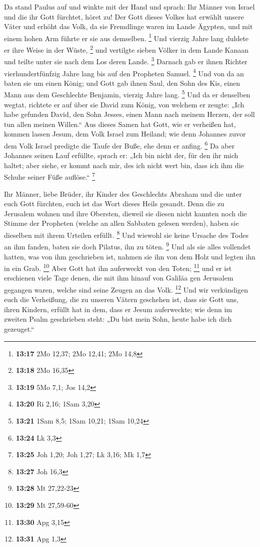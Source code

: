  Da stand Paulus auf und winkte mit der Hand und sprach:
Ihr Männer von Israel und die ihr Gott fürchtet, höret zu! 
Der Gott dieses Volkes hat erwählt unsere Väter und erhöht das Volk, da
sie Fremdlinge waren im Lande Ägypten, und mit einem hohen Arm führte er
sie aus demselben. \footnote{\textbf{13:17} 2Mo 12,37; 2Mo 12,41; 2Mo
  14,8}  Und vierzig Jahre lang duldete er ihre Weise in
der Wüste, \footnote{\textbf{13:18} 2Mo 16,35}  und
vertilgte sieben Völker in dem Lande Kanaan und teilte unter sie nach
dem Los deren Lande. \footnote{\textbf{13:19} 5Mo 7,1; Jos 14,2}
 Darnach gab er ihnen Richter vierhundertfünfzig Jahre lang
bis auf den Propheten Samuel. \footnote{\textbf{13:20} Ri 2,16; 1Sam
  3,20}  Und von da an baten sie um einen König; und Gott
gab ihnen Saul, den Sohn des Kis, einen Mann aus dem Geschlechte
Benjamin, vierzig Jahre lang. \footnote{\textbf{13:21} 1Sam 8,5; 1Sam
  10,21; 1Sam 10,24}  Und da er denselben wegtat, richtete
er auf über sie David zum König, von welchem er zeugte: „Ich habe
gefunden David, den Sohn Jesses, einen Mann nach meinem Herzen, der soll
tun allen meinen Willen.``  Aus dieses Samen hat Gott, wie
er verheißen hat, kommen lassen Jesum, dem Volk Israel zum Heiland;
 wie denn Johannes zuvor dem Volk Israel predigte die Taufe
der Buße, ehe denn er anfing. \footnote{\textbf{13:24} Lk 3,3}
 Da aber Johannes seinen Lauf erfüllte, sprach er: „Ich bin
nicht der, für den ihr mich haltet; aber siehe, er kommt nach mir, des
ich nicht wert bin, dass ich ihm die Schuhe seiner Füße auflöse.``
\footnote{\textbf{13:25} Joh 1,20; Joh 1,27; Lk 3,16; Mk 1,7}

 Ihr Männer, liebe Brüder, ihr Kinder des Geschlechts
Abraham und die unter euch Gott fürchten, euch ist das Wort dieses Heils
gesandt.  Denn die zu Jerusalem wohnen und ihre Obersten,
dieweil sie diesen nicht kannten noch die Stimme der Propheten (welche
an allen Sabbaten gelesen werden), haben sie dieselben mit ihrem
Urteilen erfüllt. \footnote{\textbf{13:27} Joh 16,3}  Und
wiewohl sie keine Ursache des Todes an ihm fanden, baten sie doch
Pilatus, ihn zu töten. \footnote{\textbf{13:28} Mt 27,22-23}
 Und als sie alles vollendet hatten, was von ihm
geschrieben ist, nahmen sie ihn von dem Holz und legten ihn in ein Grab.
\footnote{\textbf{13:29} Mt 27,59-60}  Aber Gott hat ihn
auferweckt von den Toten; \footnote{\textbf{13:30} Apg 3,15}
 und er ist erschienen viele Tage denen, die mit ihm hinauf
von Galiläa gen Jerusalem gegangen waren, welche sind seine Zeugen an
das Volk. \footnote{\textbf{13:31} Apg 1,3}  Und wir
verkündigen euch die Verheißung, die zu unseren Vätern geschehen ist,
 dass sie Gott uns, ihren Kindern, erfüllt hat in dem, dass
er Jesum auferweckte; wie denn im zweiten Psalm geschrieben steht: „Du
bist mein Sohn, heute habe ich dich gezeuget.``

